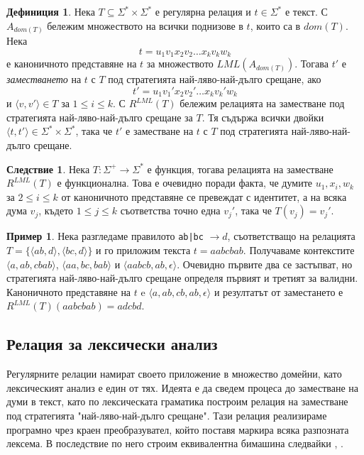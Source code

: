 \documentclass[12pt, oneside]{article}
\theoremstyle{definition}
\newtheorem{definition}{Дефиниция}[section]
\newtheorem{example}{Пример}[section]
\newtheorem{corollary}{Следствие}[section]
\begin{document}
\begin{definition}
	Нека \( T \subseteq \Sigma^* \times \Sigma^* \) е регулярна релация и \( t \in \Sigma^* \) е текст. С \( A_{dom(T)} \) бележим множеството на всички поднизове в \(t\), които са в \(dom(T)\). Нека \[ t = u_1 v_1 x_2 v_2 \dots x_k v_k w_k \] е каноничното представяне на \(t\) за множеството \( LML(A_{dom(T)}) \). Тогава \(t'\) е \emph{заместването} на \(t\) с \(T\) под стратегията най-ляво-най-дълго срещане, ако 
	\[t' = u_1 v_1' x_2 v_2' \dots x_k v_k' w_k\] 
	и \( \langle v, v' \rangle \in T \) за \( 1 \leq i \leq k \). С \( R^{LML}(T) \) бележим релацията на заместване под стратегията най-ляво-най-дълго срещане за \(T\). Тя съдържа всички двойки \( \langle t, t' \rangle \in \Sigma^* \times \Sigma^* \), така че \( t' \) е заместване на \( t \) с \(T\) под стратегията най-ляво-най-дълго срещане.
\end{definition}

\begin{corollary}
	Нека \( T: \Sigma^+ \to \Sigma^* \) е функция, тогава релацията на заместване \( R^{LML}(T) \) е функционална. Това е очевидно поради факта, че думите \(u_1, x_i, w_k \) за \( 2 \le i \le k \) от каноничното представяне се превеждат с идентитет, а на всяка дума \( v_j \), където \( 1 \le j \le k \) съответства точно една \( v_j' \), така че \( T(v_j) = v_j' \).
\end{corollary}

\begin{example}
	Нека разгледаме правилото \verb/ab|bc/ \( \to d \), съответстващо на релацията \(T = \{ \langle ab,d \rangle, \langle bc, d \rangle \} \) и го приложим текста \( t = aabcbab \). Получаваме контекстите \( \langle a, ab, cbab \rangle \), \( \langle aa, bc, bab \rangle \) и \( \langle aabcb, ab, \epsilon \rangle \). Очевидно първите два се застъпват, но стратегията най-ляво-най-дълго срещане определя първият и третият за валидни. Каноничното представяне на \(t \) e \( \langle a, ab, cb, ab, \epsilon  \rangle \) и резултатът от заместането е \( R^{LML}(T)(aabcbab) = adcbd \).
\end{example}

\pagebreak
\subsection{Релация за лексически анализ}
\label{sec:LexARegRel}
Регулярните релации намират своето приложение в множество домейни, като лексическият анализ е един от тях. Идеята е да сведем процеса до заместване на думи в текст, като по лексическата граматика построим релация на заместване под стратегията "най-ляво-най-дълго срещане". Тази релация реализираме програмно чрез краен преобразувател, който поставя маркира всяка разпозната лексема. В последствие по него строим еквивалентна бимашина следвайки \cite{GerdjikovEtAl:2017}, \cite{Mihov:2018-2}.
\end{document}

